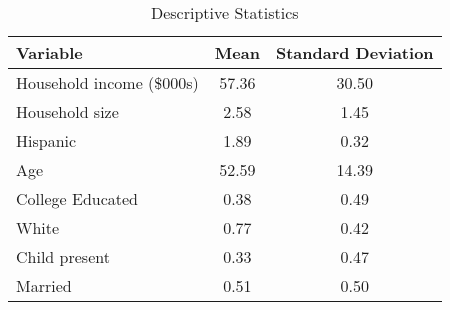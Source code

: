 \begin{table}[!htbp] \centering
  \caption{Descriptive Statistics}
  \label{tab:homescanSummaryStats}
\begin{tabular}{lcc}
\hline
Variable & Mean & Standard Deviation\\
\hline
Household income (\$000s) & 57.36 & 30.50\\
Household size & 2.58 & 1.45\\
Hispanic & 1.89 & 0.32\\
Age & 52.59 & 14.39\\
College Educated & 0.38 & 0.49\\
White & 0.77 & 0.42\\
Child present & 0.33 & 0.47\\
Married & 0.51 & 0.50\\
\hline
\hline
\end{tabular}
\end{table}
